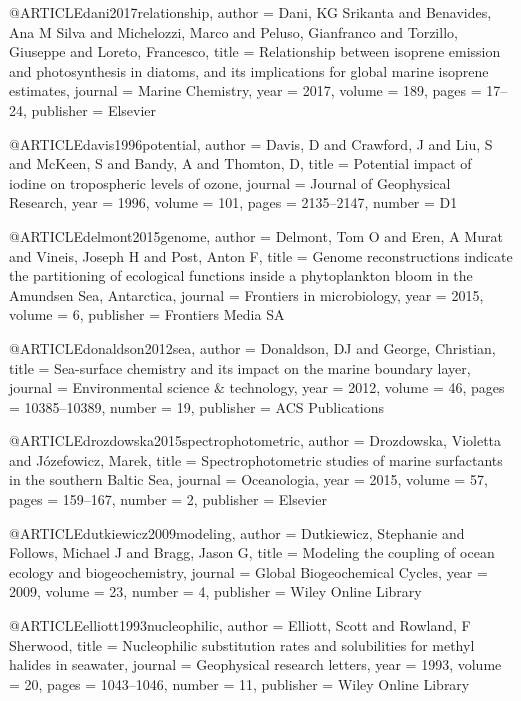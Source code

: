 @ARTICLE{dani2017relationship,
  author = {Dani, KG Srikanta and Benavides, Ana M Silva and Michelozzi, Marco
	and Peluso, Gianfranco and Torzillo, Giuseppe and Loreto, Francesco},
  title = {Relationship between isoprene emission and photosynthesis in diatoms,
	and its implications for global marine isoprene estimates},
  journal = {Marine Chemistry},
  year = {2017},
  volume = {189},
  pages = {17--24},
  publisher = {Elsevier}
}

@ARTICLE{davis1996potential,
  author = {Davis, D and Crawford, J and Liu, S and McKeen, S and Bandy, A and
	Thomton, D},
  title = {Potential impact of iodine on tropospheric levels of ozone},
  journal = {Journal of Geophysical Research},
  year = {1996},
  volume = {101},
  pages = {2135--2147},
  number = {D1}
}

@ARTICLE{delmont2015genome,
  author = {Delmont, Tom O and Eren, A Murat and Vineis, Joseph H and Post, Anton
	F},
  title = {Genome reconstructions indicate the partitioning of ecological functions
	inside a phytoplankton bloom in the Amundsen Sea, Antarctica},
  journal = {Frontiers in microbiology},
  year = {2015},
  volume = {6},
  publisher = {Frontiers Media SA}
}

@ARTICLE{donaldson2012sea,
  author = {Donaldson, DJ and George, Christian},
  title = {Sea-surface chemistry and its impact on the marine boundary layer},
  journal = {Environmental science \& technology},
  year = {2012},
  volume = {46},
  pages = {10385--10389},
  number = {19},
  publisher = {ACS Publications}
}

@ARTICLE{drozdowska2015spectrophotometric,
  author = {Drozdowska, Violetta and J{\'o}zefowicz, Marek},
  title = {Spectrophotometric studies of marine surfactants in the southern
	Baltic Sea},
  journal = {Oceanologia},
  year = {2015},
  volume = {57},
  pages = {159--167},
  number = {2},
  publisher = {Elsevier}
}

@ARTICLE{dutkiewicz2009modeling,
  author = {Dutkiewicz, Stephanie and Follows, Michael J and Bragg, Jason G},
  title = {Modeling the coupling of ocean ecology and biogeochemistry},
  journal = {Global Biogeochemical Cycles},
  year = {2009},
  volume = {23},
  number = {4},
  publisher = {Wiley Online Library}
}

@ARTICLE{elliott1993nucleophilic,
  author = {Elliott, Scott and Rowland, F Sherwood},
  title = {Nucleophilic substitution rates and solubilities for methyl halides
	in seawater},
  journal = {Geophysical research letters},
  year = {1993},
  volume = {20},
  pages = {1043--1046},
  number = {11},
  publisher = {Wiley Online Library}
}


